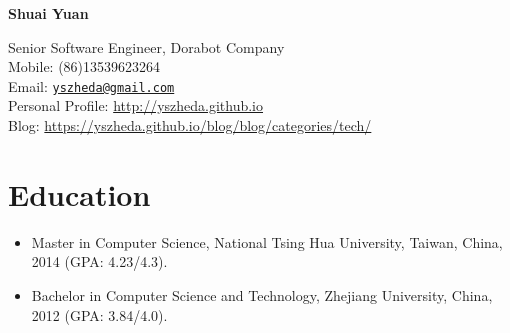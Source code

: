 \documentclass[letterpaper]{article}
\def\name{Shuai Yuan}
\begin{document}
\centerline{\huge\bf \name} \vspace{0.25in}
\begin{minipage}[t]{0.8\textwidth}
    Senior Software Engineer, Dorabot Company \\
    Mobile: (86)13539623264   \\
    Email: \href{mailto:yszheda@gmail.com}{\tt yszheda@gmail.com}\\
    Personal Profile: \url{http://yszheda.github.io} \\
    Blog: \url{https://yszheda.github.io/blog/blog/categories/tech/}
\end{minipage}

\section*{Education}
\begin{itemize}
    \item Master in Computer Science, National Tsing Hua University, Taiwan, China, 2014 (GPA: 4.23/4.3).
    \item Bachelor in Computer Science and Technology, Zhejiang University, China, 2012 (GPA: 3.84/4.0).
\end{itemize}
\end{document}
